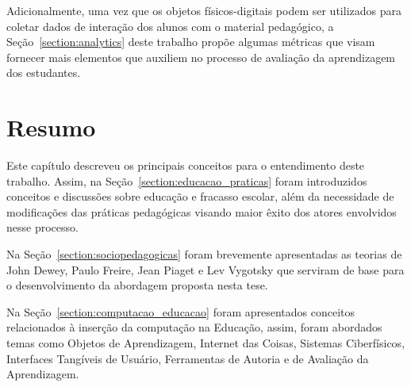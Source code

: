 Adicionalmente, uma vez que os objetos físicos-digitais podem ser utilizados para coletar dados de interação dos alunos com o material pedagógico, a Seção~\ref{section:analytics} deste trabalho propõe algumas métricas que visam fornecer mais elementos que auxiliem no processo de avaliação da aprendizagem dos estudantes.


\section{Resumo}

Este capítulo descreveu os principais conceitos para o entendimento deste trabalho. Assim, na Seção~\ref{section:educacao_praticas} foram introduzidos conceitos e discussões sobre educação e fracasso escolar, além da necessidade de modificações das práticas pedagógicas visando maior êxito dos atores envolvidos nesse processo. %

Na Seção~\ref{section:sociopedagogicas} foram brevemente apresentadas as teorias de John Dewey, Paulo Freire, Jean Piaget e Lev Vygotsky que serviram de base para o desenvolvimento da abordagem proposta nesta tese. 

Na Seção~\ref{section:computacao_educacao} foram apresentados conceitos relacionados à inserção da computação na Educação, assim, foram abordados temas como %
Objetos de Aprendizagem, Internet das Coisas, Sistemas Ciberfísicos, Interfaces Tangíveis de Usuário, 
Ferramentas de Autoria e de Avaliação da Aprendizagem. 
